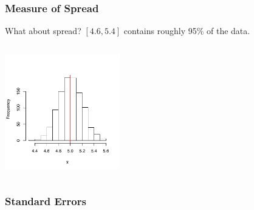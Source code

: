 \documentclass[slides]{beamer}
\newcommand{\blue}[1]{\textcolor{blue2}{#1}}
\begin{document}
\begin{frame}[fragile]
\frametitle{Measure of Spread}
What about spread?  $[4.6, 5.4]$ contains roughly 95\% of the data.

\begin{columns}[c]
\includegraphics[width=5cm]{figure/lec12-001}
\end{columns}




\end{frame}


\begin{frame}[fragile]
\frametitle{Standard Errors}

%
%
%
%
%
%

\end{frame}
\end{document}
